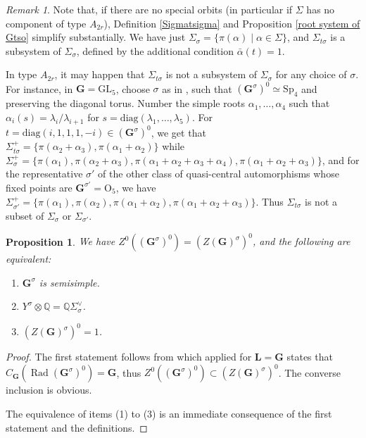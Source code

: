 \documentclass{amsart}
\newtheorem{proposition}[equation]{Proposition}
\numberwithin{equation}{section}
\theoremstyle{definition}
\theoremstyle{remark}
\newtheorem{remark}[equation]{Remark}
\newcommand\bG{{\mathbf G}}
\newcommand\bL{{\mathbf L}}
\newcommand\BQ{{\mathbb Q}}
\newcommand\Gs{{\bG^\sigma}}
\newcommand\Gso{{(\Gs)^0}}
\newcommand\Zso{{(Z(\bG)^\sigma)^0}}
\DeclareMathOperator\Rad{\mathrm{Rad}}
\newcommand\GL{\mathrm{GL}}
\newcommand\Orth{\mathrm{O}}
\newcommand\Sp{\mathrm{Sp}}
\newcommand\diag{\mathrm{diag}}
\begin{document}
\begin{remark}
Note that, if there are no special orbits (in particular if $\Sigma$
has no component of type $A_{2r}$), Definition \ref{Sigmatsigma} and 
Proposition \ref{root system of Gtso} simplify substantially. We have just
$\Sigma_\sigma=\{\pi(\alpha)\mid  \alpha\in \Sigma\}$, and $\Sigma_{t\sigma}$
is  a  subsystem  of  $\Sigma_\sigma$,  defined by the additional condition
$\bar\alpha(t)=1$.

In  type $A_{2r}$, it may happen that $\Sigma_{t\sigma}$ is not a subsystem
of   $\Sigma_\sigma$  for  any   choice  of  $\sigma$.   For  instance,  in
$\bG=\GL_5$,    choose   $\sigma$ as in \cite[page 357]{grnc},
such   that   $\Gso\simeq\Sp_4$  and preserving the diagonal torus.
Number the simple roots
$\alpha_1,\ldots,\alpha_4$ such that
$\alpha_i(s)=\lambda_i/\lambda_{i+1}$ for
$s=\diag(\lambda_1,\ldots,\lambda_5)$.
For $t=\diag(i,1,1,1,-i)\in\Gso$, we get that
$\Sigma_{t\sigma}^+=\{\pi(\alpha_2+\alpha_3),\pi(\alpha_1+\alpha_2)\}$
while $\Sigma_\sigma^+=\{\pi(\alpha_1),\pi(\alpha_2+\alpha_3),
\pi(\alpha_1+\alpha_2+\alpha_3+\alpha_4),
\pi(\alpha_1+\alpha_2+\alpha_3)\}$,   and   for   the   representative
$\sigma'$ of the other  class of quasi-central
automorphisms  whose  fixed  points are $\bG^{\sigma'}=\Orth_5$, we have
$\Sigma_{\sigma'}^+= \{\pi(\alpha_1),\pi(\alpha_2),
\pi(\alpha_1+\alpha_2),\pi(\alpha_1+\alpha_2+\alpha_3)\}$. Thus
$\Sigma_{t\sigma}$ is not a subset of $\Sigma_\sigma$ or $\Sigma_{\sigma'}$.
\end{remark}
\begin{proposition}\label{Gs ss}
We have $Z^0(\Gso)=\Zso$, and
the following are equivalent:
\begin{enumerate}
\item $\Gs$ is semisimple.
\item $Y^\sigma\otimes\BQ=\BQ\Sigma^\vee_\sigma$.
\item $\Zso=1$.
\end{enumerate}
\end{proposition}
\begin{proof}
The first statement follows from \cite[Corollaire 1.25(ii)]{grnc}
which applied for $\bL=\bG$ states that $C_\bG(\Rad\Gso)=\bG$, thus
$Z^0(\Gso)\subset \Zso$. The converse inclusion is obvious.

The equivalence of items (1) to (3) is an immediate consequence of the
first statement and the definitions.
\end{proof}
\end{document}
